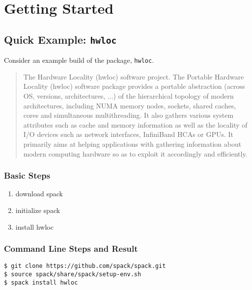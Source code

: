 \documentclass[10pt, oneside]{article}   	%
\begin{document}
\section{Getting Started}

\subsection{Quick Example: \texttt{hwloc}}
Consider an example build of the package, \texttt{hwloc}.

\begin{quote}
The Hardware Locality (hwloc) software project. The Portable Hardware
Locality (hwloc) software package provides a portable abstraction
(across OS, versions, architectures, ...) of the hierarchical topology
of modern architectures, including NUMA memory nodes, sockets, shared
caches, cores and simultaneous multithreading. It also gathers various
system attributes such as cache and memory information as well as the
locality of I/O devices such as network interfaces, InfiniBand HCAs or
GPUs. It primarily aims at helping applications with gathering
information about modern computing hardware so as to exploit it
accordingly and efficiently.
\end{quote}

\subsubsection{Basic Steps}
\begin{enumerate}
	\item download spack
	\item initialize spack
	\item install hwloc
\end{enumerate}

\subsubsection{Command Line Steps and Result}
\begin{verbatim}
$ git clone https://github.com/spack/spack.git
$ source spack/share/spack/setup-env.sh
$ spack install hwloc
\end{verbatim}

\end{document}
